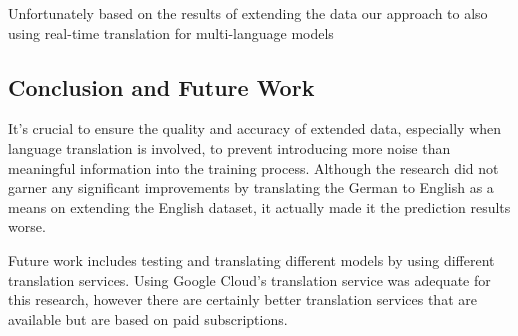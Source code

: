 \documentclass[11pt]{article}
\begin{document}
Unfortunately based on the results of extending the data our approach to also using real-time translation for multi-language models 

\subsection{Conclusion and Future Work}
It's crucial to ensure the quality and accuracy of extended data, especially when language translation is involved, to prevent introducing more noise than meaningful information into the training process. Although the research did not garner any significant improvements by translating the German to English as a means on extending the English dataset, it actually made it the prediction results worse.

Future work includes testing and translating different models by using different translation services. Using Google Cloud's translation service was adequate for this research, however there are certainly better translation services that are available but are based on paid subscriptions.

\clearpage
{}
\printbibliography
\clearpage


\listoffigures
\clearpage


\appendix
\end{document}
